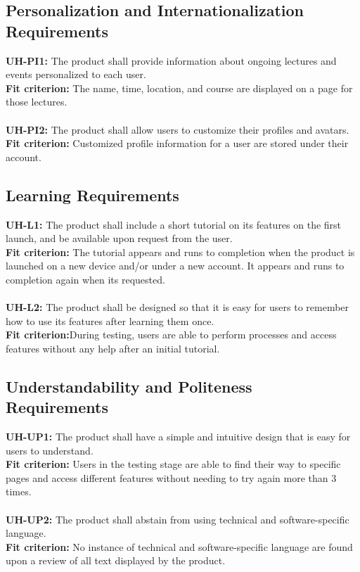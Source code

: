 \documentclass[12pt]{article}
\begin{document}
\subsection{Personalization and Internationalization Requirements}
  \textbf{UH-PI1:} The product shall provide information about ongoing lectures and events personalized to each user.\\
  \textbf{Fit criterion:} The name, time, location, and course are displayed on a page for those lectures.\\\\
  \textbf{UH-PI2:} The product shall allow users to customize their profiles and avatars.\\
  \textbf{Fit criterion:} Customized profile information for a user are stored under their account.\\
\subsection{Learning Requirements}
  \textbf{UH-L1:} The product shall include a short tutorial on its features on the first launch, and be available upon request from the user.\\
  \textbf{Fit criterion:} The tutorial appears and runs to completion when the product is launched on a new device and/or under a new account. It appears and runs to completion again when its requested.\\\\
  \textbf{UH-L2:} The product shall be designed so that it is easy for users to remember how to use its features after learning them once.\\
  \textbf{Fit criterion:}During testing, users are able to perform processes and access features without any help after an initial tutorial.\\
\subsection{Understandability and Politeness Requirements}
  \textbf{UH-UP1:} The product shall have a simple and intuitive design that is easy for users to understand.\\
  \textbf{Fit criterion:} Users in the testing stage are able to find their way to specific pages and access different features without needing to try again more than 3 times.\\\\
  \textbf{UH-UP2:} The product shall abstain from using technical and software-specific language.\\
  \textbf{Fit criterion:} No instance of technical and software-specific language are found upon a review of all text displayed by the product.\\
\end{document}

